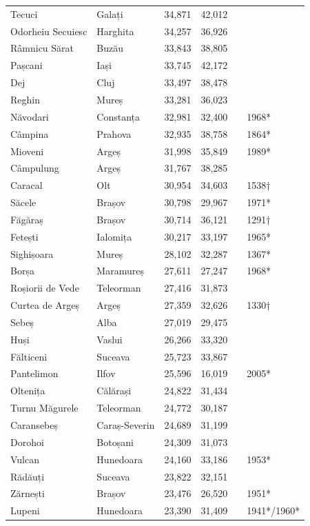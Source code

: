 \documentclass{article}
\begin{document}
\begin{tabular}{llllll}
Tecuci & Galați & 34,871 & 42,012 &  &  \\
Odorheiu Secuiesc & Harghita & 34,257 & 36,926 &  &  \\
Râmnicu Sărat & Buzău & 33,843 & 38,805 &  &  \\
Pașcani & Iași & 33,745 & 42,172 &  &  \\
Dej & Cluj & 33,497 & 38,478 &  &  \\
Reghin & Mureș & 33,281 & 36,023 &  &  \\
Năvodari & Constanța & 32,981 & 32,400 &  & 1968* \\
Câmpina & Prahova & 32,935 & 38,758 &  & 1864* \\
Mioveni & Argeș & 31,998 & 35,849 &  & 1989* \\
Câmpulung & Argeș & 31,767 & 38,285 &  &  \\
Caracal & Olt & 30,954 & 34,603 &  & 1538† \\
Săcele & Brașov & 30,798 & 29,967 &  & 1971* \\
Făgăraș & Brașov & 30,714 & 36,121 &  & 1291† \\
Fetești & Ialomița & 30,217 & 33,197 &  & 1965* \\
Sighișoara & Mureș & 28,102 & 32,287 &  & 1367* \\
Borșa & Maramureș & 27,611 & 27,247 &  & 1968* \\
Roșiorii de Vede & Teleorman & 27,416 & 31,873 &  &  \\
Curtea de Argeș & Argeș & 27,359 & 32,626 &  & 1330† \\
Sebeș & Alba & 27,019 & 29,475 &  &  \\
Huși & Vaslui & 26,266 & 33,320 &  &  \\
Fălticeni & Suceava & 25,723 & 33,867 &  &  \\
Pantelimon & Ilfov & 25,596 & 16,019 &  & 2005* \\
Oltenița & Călărași & 24,822 & 31,434 &  &  \\
Turnu Măgurele & Teleorman & 24,772 & 30,187 &  &  \\
Caransebeș & Caraș-Severin & 24,689 & 31,199 &  &  \\
Dorohoi & Botoșani & 24,309 & 31,073 &  &  \\
Vulcan & Hunedoara & 24,160 & 33,186 &  & 1953* \\
Rădăuți & Suceava & 23,822 & 32,151 &  &  \\
Zărnești & Brașov & 23,476 & 26,520 &  & 1951* \\
Lupeni & Hunedoara & 23,390 & 31,409 &  & 1941*/1960* \\

\end{tabular}
\end{document}
